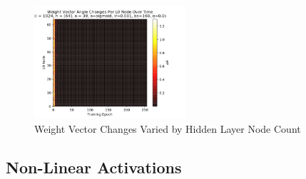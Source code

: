 \documentclass[10pt,epsf]{article}
\begin{document}
{{\begin{figure}[h]
      \includegraphics[width=0.5\textwidth]{./img/64-0.001-160-0-sigmoid-1/weight-angle-changes-L0-255.png}
      \caption{Weight Vector Changes Varied by Hidden Layer Node Count}
      \label{fig:dw-by-nh}
    \end{figure}
  }

  \subsection{Non-Linear Activations}{
}}
\end{document}
